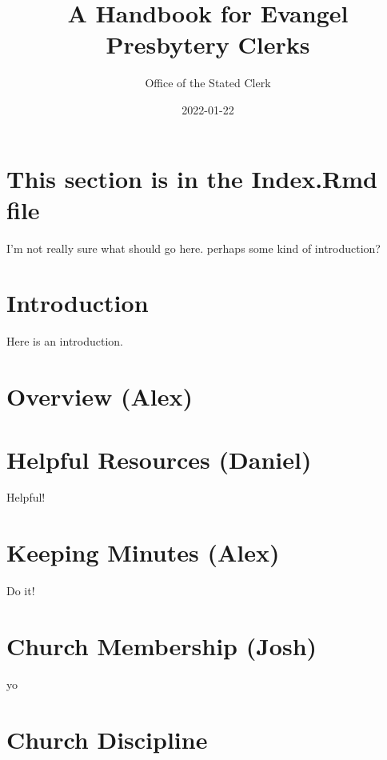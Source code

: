 \documentclass[
]{book}
\title{A Handbook for Evangel Presbytery Clerks}
\author{Office of the Stated Clerk}
\date{2022-01-22}
\begin{document}
\maketitle

{
\setcounter{tocdepth}{1}
\tableofcontents
}
\hypertarget{this-section-is-in-the-index.rmd-file}{%
\chapter{This section is in the Index.Rmd file}\label{this-section-is-in-the-index.rmd-file}}

I'm not really sure what should go here. perhaps some kind of introduction?

\hypertarget{intro}{%
\chapter{Introduction}\label{intro}}

Here is an introduction.

\hypertarget{overview-alex}{%
\chapter{Overview (Alex)}\label{overview-alex}}

\hypertarget{helpful-resources-daniel}{%
\chapter{Helpful Resources (Daniel)}\label{helpful-resources-daniel}}

Helpful!

\hypertarget{keeping-minutes-alex}{%
\chapter{Keeping Minutes (Alex)}\label{keeping-minutes-alex}}

Do it!

\hypertarget{church-membership-josh}{%
\chapter{Church Membership (Josh)}\label{church-membership-josh}}

yo

\hypertarget{church-discipline}{%
\chapter{Church Discipline}\label{church-discipline}}
\end{document}
